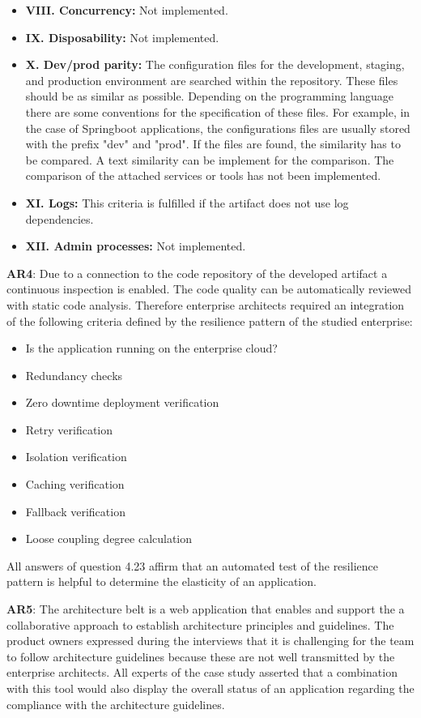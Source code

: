 \begin{itemize}
\item \textbf{VIII. Concurrency:} Not implemented.

\item \textbf{IX. Disposability:} Not implemented.

\item \textbf{X. Dev/prod parity:} The configuration files for the development, staging, and production environment are searched within the repository. These files should be as similar as possible. Depending on the programming language there are some conventions for the specification of these files. For example, in the case of Springboot applications, the configurations files are usually stored with the prefix "dev" and "prod". If the files are found, the similarity has to be compared. A text similarity can be implement for the comparison. The comparison of the attached services or tools has not been implemented.

\item \textbf{XI. Logs:} This criteria is fulfilled if the artifact does not use log dependencies.

\item \textbf{XII. Admin processes:} Not implemented.
\end{itemize}

\textbf{AR4}: Due to a connection to the code repository of the developed artifact a continuous inspection is enabled. The code quality can be automatically reviewed with static code analysis. Therefore enterprise architects required an integration of the following criteria defined by the resilience pattern of the studied enterprise:
\begin{itemize}
    \item Is the application running on the enterprise cloud?
    \item Redundancy checks
    \item Zero downtime deployment verification
    \item Retry verification
    \item Isolation verification
    \item Caching verification
    \item Fallback verification
    \item Loose coupling degree calculation
\end{itemize}
All answers of question 4.23 affirm that an automated test of the resilience pattern is helpful to determine the elasticity of an application.

\textbf{AR5}: The architecture belt is a web application that enables and support the a collaborative approach to establish architecture principles and guidelines. The product owners expressed during the interviews that it is challenging for the team to follow architecture guidelines because these are not well transmitted by the enterprise architects. All experts of the case study asserted that a combination with this tool would also display the overall status of an application regarding the compliance with the architecture guidelines.

